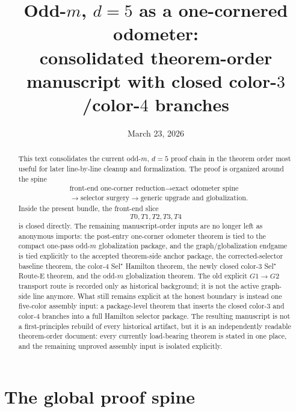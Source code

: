 \documentclass[11pt]{article}
\title{Odd-$m$, $d=5$ as a one-cornered odometer:\\
consolidated theorem-order manuscript with closed color-$3$/color-$4$ branches}
\author{}
\date{March 23, 2026}
\begin{document}
\maketitle

\begin{abstract}
This text consolidates the current odd-$m$, $d=5$ proof chain in the theorem
order most useful for later line-by-line cleanup and formalization.
The proof is organized around the spine
\[
\begin{aligned}
&\text{front-end one-corner reduction}
\to
\text{exact odometer spine}\\
&\to
\text{selector surgery}
\to
\text{generic upgrade and globalization}.
\end{aligned}
\]
Inside the present bundle, the front-end slice
\[
T0,T1,T2,T3,T4
\]
is closed directly.
The remaining manuscript-order inputs are no longer left as anonymous imports:
the post-entry one-corner odometer theorem is tied to the compact one-pass
odd-$m$ globalization package, and the graph/globalization endgame is tied
explicitly to the accepted theorem-side anchor package, the corrected-selector
baseline theorem, the color-$4$ Sel$^{\star}$ Hamilton theorem, the newly
closed color-$3$ Sel$^{\star}$ Route-E theorem, and the odd-$m$ globalization
theorem.
The old explicit \(G1\to G2\) transport route is recorded only as historical
background; it is not the active graph-side line anymore.
What still remains explicit at the honest boundary is instead one five-color
assembly input: a package-level theorem that inserts the closed color-$3$ and
color-$4$ branches into a full Hamilton selector package.
The resulting manuscript is not a first-principles rebuild of every historical
artifact, but it is an independently readable theorem-order document: every
currently load-bearing theorem is stated in one place, and the remaining
unproved assembly input is isolated explicitly.
\end{abstract}

\tableofcontents

\section{The global proof spine}
\end{document}

